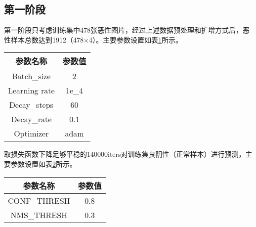 \subsection{第一阶段}
第一阶段只考虑训练集中478张恶性图片，经过上述数据预处理和扩增方式后，恶性样本总数达到1912（478×4）。主要参数设置如表\ref{tab:2_stage_1_training_config}所示。
\begin{table}[!htbp]
    \label{tab:2_stage_1_training_config}
    \centering
    \footnotesize%
    \setlength{\tabcolsep}{4pt}%
    \renewcommand{\arraystretch}{1.2}%
    \begin{tabular}{cc}
        \hline
        参数名称& 参数值 \\
        \hline
        Batch\_size & 2 \\
        Learning rate& 1e\_4 \\
        Decay\_steps & 60 \\
        Decay\_rate & 0.1 \\
        Optimizer& adam \\
        \hline
    \end{tabular}
\end{table}
\begin{comment}
打印出训练loss曲线，如图\ref{fig:stage2_trainingloss}，
	\begin{figure}[!htbp]
    \centering
    \texttt{[image: stage2\_trainingloss]}
    \bicaption{weakFaster R-CNN第一阶段loss下降曲线}{The first stage loss curve of weakFaster R-CNN}
    \label{fig:stage2_trainingloss}
	\end{figure}
\end{comment}
取损失函数下降足够平稳的140000iters对训练集良阴性（正常样本）进行预测，主要参数设置如表\ref{tab:2_stage_1_pred_config}所示。
\begin{table}[!htbp]
    \label{tab:2_stage_1_pred_config}
    \centering
    \footnotesize%
    \setlength{\tabcolsep}{4pt}%
    \renewcommand{\arraystretch}{1.2}%
    \begin{tabular}{cc}
        \hline
        参数名称& 参数值\\
        \hline
        CONF\_THRESH & 0.8\\
        NMS\_THRESH & 0.3\\
        \hline
    \end{tabular}
\end{table}

